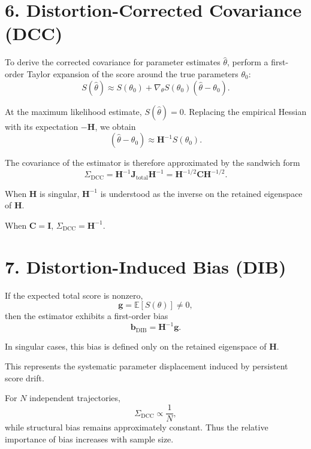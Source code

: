 \documentclass[11pt]{article}
\begin{document}
\section*{6. Distortion-Corrected Covariance (DCC)}

To derive the corrected covariance for parameter estimates $\hat{\theta}$, perform a first-order Taylor expansion of the score around the true parameters $\theta_0$:
\begin{equation}
S(\hat{\theta}) \approx S(\theta_0) + \nabla_\theta S(\theta_0)(\hat{\theta} - \theta_0).
\end{equation}

At the maximum likelihood estimate, $S(\hat{\theta}) = 0$. Replacing the empirical Hessian with its expectation $-\mathbf H$, we obtain
\begin{equation}
(\hat{\theta} - \theta_0) \approx \mathbf H^{-1} S(\theta_0).
\end{equation}

The covariance of the estimator is therefore approximated by the sandwich form
\begin{equation}
\Sigma_{\mathrm{DCC}}
=
\mathbf H^{-1}
\mathbf J_{\mathrm{total}}
\mathbf H^{-1}
=
\mathbf H^{-1/2}
\mathbf C
\mathbf H^{-1/2}.
\end{equation}

When $\mathbf H$ is singular, $\mathbf H^{-1}$ is understood as the inverse on the retained eigenspace of $\mathbf H$.

When $\mathbf C = \mathbf I$, $\Sigma_{\mathrm{DCC}} = \mathbf H^{-1}$.

\section*{7. Distortion-Induced Bias (DIB)}

If the expected total score is nonzero,
\begin{equation}
\mathbf g = \mathbb{E}[S(\theta)] \neq 0,
\end{equation}
then the estimator exhibits a first-order bias
\begin{equation}
\mathbf b_{\mathrm{DIB}}
=
\mathbf H^{-1} \mathbf g.
\end{equation}

In singular cases, this bias is defined only on the retained eigenspace of $\mathbf H$.

This represents the systematic parameter displacement induced by persistent score drift.

For $N$ independent trajectories,
\begin{equation}
\Sigma_{\mathrm{DCC}} \propto \frac{1}{N},
\end{equation}
while structural bias remains approximately constant. Thus the relative importance of bias increases with sample size.
\end{document}
